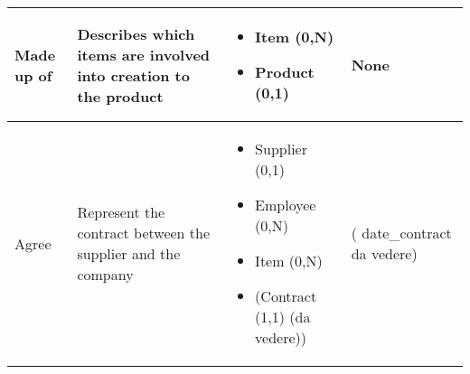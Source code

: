 \begin{longtable}{|p{}|p{} |p{}|p{} |}
Made up of & Describes which items are involved into creation to the product & \begin{itemize}
	\vspace{-1em}
	\item Item (0,N)
	\item Product (0,1)
\end{itemize}
&  None \\\hline

Agree & Represent the contract between the supplier and the company  & \begin{itemize}
	\vspace{-1em}
	\item Supplier (0,1) 
	\item Employee (0,N)
	\item Item    (0,N)
    \item (Contract  (1,1) (da vedere))
	\end{itemize}
&  ( date\_contract da vedere)\\\hline
\end{longtable}